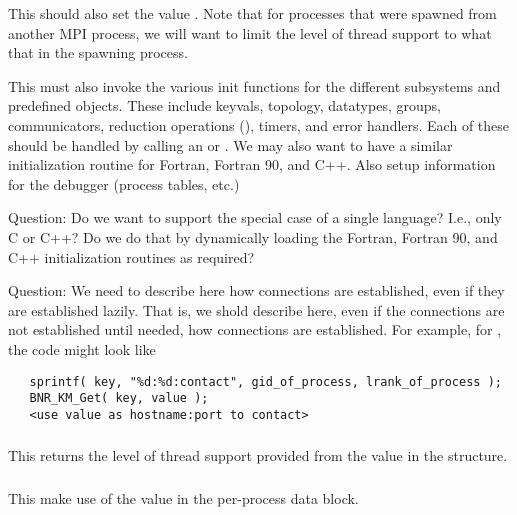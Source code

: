 \documentclass{article}
\begin{document}

This should also set the value .
Note that for processes that were spawned from another MPI process, we will
want to limit the level of thread support to what that in the spawning
process. 

This must also invoke the various init functions for the different
subsystems and predefined objects.  These include keyvals, topology, datatypes,
groups, communicators, reduction operations (), timers, and error
handlers.  Each of these should be handled by calling an
 or .  We may also
want to have a similar initialization routine for Fortran, Fortran 90,
and C++.  
Also setup information for the debugger (process tables, etc.)

Question: Do we want to support the special case of a single language?  I.e.,
only C or C++?  Do we do that by dynamically loading the Fortran, Fortran 90,
and C++ initialization routines as required?

Question:  We need to describe here how connections are established, even if
they are established lazily.  That is, we shold describe here, even if the
connections are not established until needed, how connections are
established.  For example, for \tcpname, the code might look like
\begin{verbatim}
   sprintf( key, "%d:%d:contact", gid_of_process, lrank_of_process );
   BNR_KM_Get( key, value );
   <use value as hostname:port to contact>
\end{verbatim}

\subsubsection{}
This returns the level of thread support provided from the
 value in the 
structure. 

\subsubsection{}
This make use of the  value in the
per-process data block.
\end{document}

